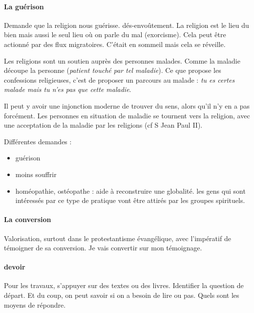      \paragraph{La guérison}
 Demande que la religion nous guérisse. dés-envoûtement. La religion est le lieu du bien mais aussi le seul lieu où on parle du mal (exorcisme). Cela peut être actionné par des flux migratoires. C'était en sommeil mais cela se réveille.

 Les religions sont un soutien auprès des personnes malades. Comme la maladie découpe la personne (\textit{patient touché par tel maladie}). Ce que propose les confessions religieuses, c'est de proposer un parcours au malade : \textit{tu es certes malade mais tu n'es pas que cette maladie}. 

 Il peut y avoir une injonction moderne de trouver du sens, alors qu'il n'y en a pas forcément. Les personnes en situation de maladie se tournent vers la religion, avec une acceptation de la maladie par les religions (cf S Jean Paul II).

 Différentes demandes : 
 \begin{itemize}
     \item guérison
     \item moins souffrir
     \item homéopathie, ostéopathe : aide à reconstruire une globalité. les gens qui sont intéressés par ce type de pratique vont être attirés par les groupes spirituels.
 \end{itemize}
     
     \paragraph{La conversion}
Valorisation, surtout dans le protestantisme évangélique, avec l'impératif de témoigner de sa conversion. Je vais convertir sur mon témoignage. 
     


\paragraph{devoir} Pour les travaux, s'appuyer sur des textes ou des livres. Identifier la question de départ. Et du coup, on peut savoir si on a besoin de lire ou pas. Quels sont les moyens de répondre. 